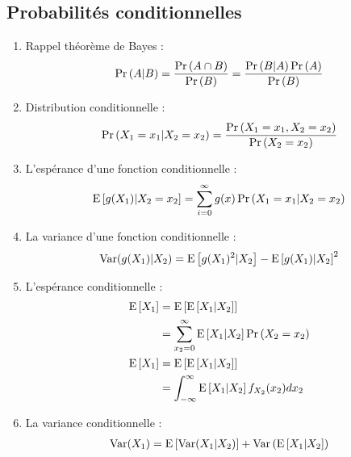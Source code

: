 \documentclass[10pt, french]{article}
\begin{document}
\small
\begin{multicols*}{2} %
\section{Probabilités conditionnelles}
\begin{enumerate}[label=\faAngleRight]
\item Rappel théorème de Bayes : 
\begin{align*}
\Pr \left( A | B \right) = \frac{\Pr \left( A \cap B \right)}{\Pr \left( B \right)} = \frac{\Pr \left( B|A \right) \Pr \left( A \right)}{\Pr \left( B \right)}
\end{align*}

\item Distribution conditionnelle : 
\begin{align*}
\Pr \left( X_1 = x_1 | X_2 = x_2 \right) & = \frac{\Pr \left( X_1 = x_1, X_2 = x_2 \right)}{\Pr \left( X_2 = x_2 \right)} \\
\end{align*}

\item L'espérance d'une fonction conditionnelle : 
\begin{align*}
\mathrm{E} \left[ g(X_1) | X_2 = x_2 \right] = \sum_{i=0}^{\infty} g(x) \Pr \left( X_1 = x_1 | X_2 = x_2 \right)
\end{align*}

\item La variance d'une fonction conditionnelle :
\begin{align*}
\mathrm{Var} (g(X_1) | X_2) = \mathrm{E} \left[ g(X_1)^2 |X_2 \right] - \mathrm{E} \left[ g(X_1) | X_2 \right]^2
\end{align*}

\item L'espérance conditionnelle : 
\begin{align*}
\mathrm{E} \left[ X_1 \right] 	& = \mathrm{E} \left[ \mathrm{E} \left[ X_1 | X_2 \right] \right] \\
			& = \sum_{x_2 = 0}^{\infty} \mathrm{E} \left[ X_1 | X_2 \right] \Pr \left( X_2 = x_2 \right) \\
\mathrm{E} \left[ X_1 \right]	& = \mathrm{E} \left[ \mathrm{E} \left[ X_1 | X_2 \right] \right] \\
			& = \int_{-\infty}^{\infty} \mathrm{E} \left[ X_1 | X_2 \right] f_{X_2}(x_2) d x_2 \\
\end{align*}

\item La variance conditionnelle : 
\begin{align*}
\mathrm{Var} (X_1) = \mathrm{E} \left[ \mathrm{Var} (X_1 | X_2) \right] + \mathrm{Var} \left( \mathrm{E} \left[ X_1 | X_2 \right] \right)
\end{align*}
\end{enumerate}


\end{multicols*}
\end{document}
